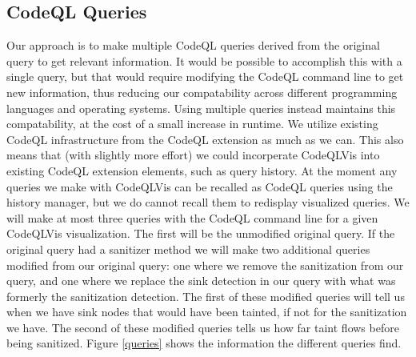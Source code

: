 \documentclass[sigplan,10pt,review]{acmart}
\begin{document}
\subsection{CodeQL Queries}
Our approach is to make multiple CodeQL queries derived from the original query to get relevant information. It would be possible to accomplish this with a single query, but that would require modifying the CodeQL command line to get new information, thus reducing our compatability across different programming languages and operating systems. Using multiple queries instead maintains this compatability, at the cost of a small increase in runtime.
\newline
\indent We utilize existing CodeQL infrastructure from the CodeQL extension as much as we can. This also means that (with slightly more effort) we could incorperate CodeQLVis into existing CodeQL extension elements, such as query history. At the moment any queries we make with CodeQLVis can be recalled as CodeQL queries using the history manager, but we do cannot recall them to redisplay visualized queries.
\newline
\indent We will make at most three queries with the CodeQL command line for a given CodeQLVis visualization. The first will be the unmodified original query. If the original query had a sanitizer method we will make two additional queries modified from our original query: one where we remove the sanitization from our query, and one where we replace the sink detection in our query with what was formerly the sanitization detection. The first of these modified queries will tell us when we have sink nodes that would have been tainted, if not for the sanitization we have. The second of these modified queries tells us how far taint flows before being sanitized. Figure \ref{queries} shows the information the different queries find.
\newline
\end{document}
